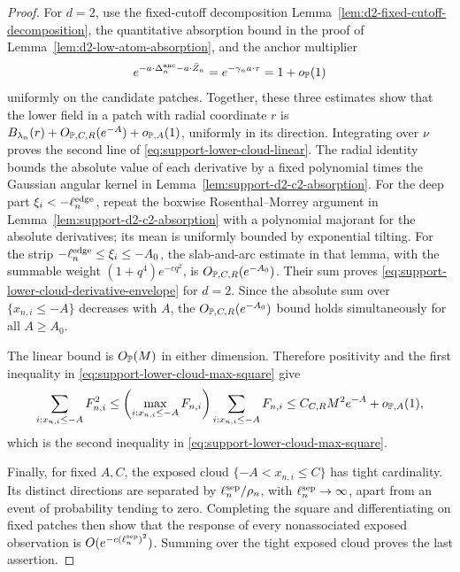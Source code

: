 \begin{proof}
For \(d=2\), use the fixed-cutoff decomposition
Lemma~\ref{lem:d2-fixed-cutoff-decomposition}, the quantitative absorption
bound in the proof of Lemma~\ref{lem:d2-low-atom-absorption}, and the anchor
multiplier
\[
 e^{-a\cdot\Delta_n^{\rm anc}-a\cdot\bar Z_n}
 =e^{-\gamma_na\cdot\tau}=1+o_{\mathbb P}(1)
\]
uniformly on the candidate patches. Together, these three estimates show that the lower field in a patch
with radial coordinate \(r\) is
\(B_{\lambda_n}(r)+O_{\mathbb P,C,R}(e^{-A})+o_{\mathbb P,A}(1)\), uniformly in its
direction.  Integrating over \(\nu\) proves the second line of
\eqref{eq:support-lower-cloud-linear}.
The radial identity bounds the absolute value of each derivative by a fixed
polynomial times the Gaussian angular kernel in
Lemma~\ref{lem:support-d2-c2-absorption}. For the deep part
\(\xi_i<-\ell_n^{\rm edge}\), repeat the boxwise Rosenthal--Morrey argument in
Lemma~\ref{lem:support-d2-c2-absorption} with a polynomial majorant for the
absolute derivatives; its mean is uniformly bounded by exponential tilting.
For the strip
\(-\ell_n^{\rm edge}\le\xi_i\le-A_0\), the slab-and-arc estimate in that
lemma, with the summable weight \((1+q^4)e^{-cq^2}\), is
\(O_{\mathbb P,C,R}(e^{-A_0})\).  Their sum proves
\eqref{eq:support-lower-cloud-derivative-envelope} for \(d=2\).  Since the
absolute sum over \(\{x_{n,i}\le-A\}\) decreases with \(A\), the
\(O_{\mathbb P,C,R}(e^{-A_0})\) bound holds simultaneously for all \(A\ge A_0\).

The linear bound is \(O_{\mathbb P}(M)\) in either dimension.  Therefore
positivity and the first inequality in
\eqref{eq:support-lower-cloud-max-square} give
\[
 \sum_{i:x_{n,i}\le-A}F_{n,i}^2
 \le
 \left(\max_{i:x_{n,i}\le-A}F_{n,i}\right)
 \sum_{i:x_{n,i}\le-A}F_{n,i}
 \le C_{C,R}M^2e^{-A}+o_{\mathbb P,A}(1),
\]
which is the second inequality in
\eqref{eq:support-lower-cloud-max-square}.

Finally, for fixed \(A,C\), the exposed cloud
\(\{-A<x_{n,i}\le C\}\) has tight cardinality.  Its distinct directions are
separated by \(\ell_n^{\rm sep}/\rho_n\), with
\(\ell_n^{\rm sep}\to\infty\), apart from an event of probability tending to
zero.  Completing the square and differentiating on fixed patches then show
that the response of every nonassociated exposed observation is
\(O(e^{-c(\ell_n^{\rm sep})^2})\).  Summing over the tight exposed cloud proves
the last assertion.
\end{proof}

